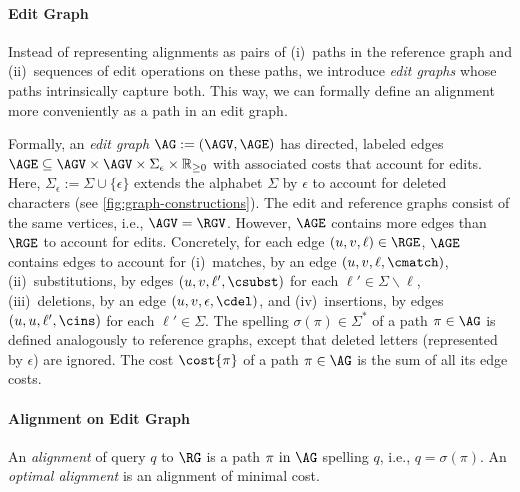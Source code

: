 \paragraph{Edit Graph}
Instead of representing alignments as pairs of (i)~paths in the reference graph and
(ii)~sequences of edit operations on these paths, we introduce \textit{edit
graphs} whose paths intrinsically capture both. This way, we can
formally define an alignment more conveniently as a path in an edit graph.

Formally, an \emph{edit graph} $\AG:=(\AGV,\AGE)$ has directed, labeled edges
$\AGE \subseteq \AGV \times \AGV \times \Sigma_\epsilon \times \mathbb{R}_{\geq
0}$ with associated costs that account for edits. Here, $\Sigma_\epsilon :=
\Sigma \cup \{\epsilon\}$ extends the alphabet $\Sigma$ by $\epsilon$ to account
for deleted characters (see \cref{fig:graph-constructions}).
%
The edit and reference graphs consist
of the same vertices, i.e., $\AGV=\RGV$. However, $\AGE$ contains more edges
than $\RGE$ to account for edits.
%
Concretely, for each edge $(u,v,\ell) \in \RGE$, $\AGE$ contains edges to
account for (i)~matches, by an edge $(u,v,\ell,\cmatch)$, (ii)~substitutions, by
edges $(u,v,\ell',\csubst)$ for each $\ell' \in \Sigma \backslash \ell$,
(iii)~deletions, by an edge $(u,v,\epsilon,\cdel)$, and (iv)~insertions, by
edges $(u,u,\ell',\cins)$ for each $\ell' \in \Sigma$.
%
The spelling $\sigma(\pi) \in \Sigma^*$ of a path $\pi \in \AG$ is defined
analogously to reference graphs, except that deleted letters (represented by
$\epsilon$) are ignored. The cost $\cost{\pi}$ of a path $\pi \in \AG$ is the
sum of all its edge costs.

\paragraph{Alignment on Edit Graph}
An \emph{alignment} of query $q$ to $\RG$ is a path $\pi \text{ in } \AG$
spelling $q$, i.e., $q=\sigma(\pi)$. An \emph{optimal alignment} is an alignment
of minimal cost.
